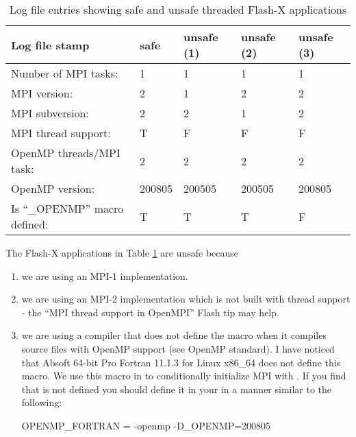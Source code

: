 \begin{table}[!h]
\begin{center}
    \begin{tabular}{ | l | l | l | l | l |}
    \hline

    {\bf Log file stamp} & {\bf safe} & {\bf unsafe (1)} & {\bf unsafe
      (2)} & {\bf unsafe (3)}\\ \hline

    Number of MPI tasks:                  & 1 & 1 & 1 & 1\\ \hline
    MPI version:                          & 2 & \cellcolor{red} 1 & 2 & 2\\ \hline
    MPI subversion:                       & 2 & 2 & 1 & 2\\ \hline
    MPI thread support:                   & T & \cellcolor{red} F & \cellcolor{red} F & \cellcolor{red} F\\ \hline
    OpenMP threads/MPI task:              & 2 & 2 & 2 & 2\\ \hline
    OpenMP version:                       & 200805 & 200505 & 200505 & 200805\\ \hline
    Is ``\_OPENMP'' macro defined:        & T & T & T & \cellcolor{red} F\\ \hline

    \end{tabular}
    \caption{Log file entries showing safe and unsafe threaded Flash-X
      applications}
    \label{tab:flash_openmp_logs}
\end{center}
\end{table}

The Flash-X applications in Table \ref{tab:flash_openmp_logs} are unsafe
because

\begin{enumerate}
\item we are using an MPI-1 implementation.

\item we are using an MPI-2 implementation which is not built with
  thread support - the ``MPI thread support in OpenMPI'' Flash tip may
  help.

\item we are using a compiler that does not define the macro
   when it compiles source files with OpenMP support
  (see OpenMP standard).  I have noticed that Absoft 64-bit Pro
  Fortran 11.1.3 for Linux x86\_64 does not define this macro.  We use
  this macro in  to conditionally
  initialize MPI with .  If you find that
   is not defined you should define it in your
   in a manner similar to the following:
\begin{codeseg}
OPENMP_FORTRAN = -openmp -D_OPENMP=200805
\end{codeseg}

\end{enumerate}


